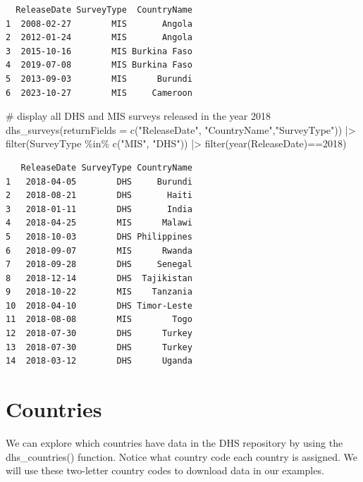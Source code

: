 \documentclass[
  letterpaper,
  DIV=11,
  numbers=noendperiod]{scrreprt}
\newenvironment{Shaded}{\begin{snugshade}}{\end{snugshade}}
\newcommand{\AttributeTok}[1]{\textcolor[rgb]{0.40,0.45,0.13}{#1}}
\newcommand{\CommentTok}[1]{\textcolor[rgb]{0.37,0.37,0.37}{#1}}
\newcommand{\DecValTok}[1]{\textcolor[rgb]{0.68,0.00,0.00}{#1}}
\newcommand{\FunctionTok}[1]{\textcolor[rgb]{0.28,0.35,0.67}{#1}}
\newcommand{\NormalTok}[1]{\textcolor[rgb]{0.00,0.23,0.31}{#1}}
\newcommand{\SpecialCharTok}[1]{\textcolor[rgb]{0.37,0.37,0.37}{#1}}
\newcommand{\StringTok}[1]{\textcolor[rgb]{0.13,0.47,0.30}{#1}}
\begin{document}
\begin{verbatim}
  ReleaseDate SurveyType  CountryName
1  2008-02-27        MIS       Angola
2  2012-01-24        MIS       Angola
3  2015-10-16        MIS Burkina Faso
4  2019-07-08        MIS Burkina Faso
5  2013-09-03        MIS      Burundi
6  2023-10-27        MIS     Cameroon
\end{verbatim}

\begin{Shaded}
\begin{Highlighting}[]
\CommentTok{\# display all DHS and MIS surveys released in the year 2018}
\FunctionTok{dhs\_surveys}\NormalTok{(}\AttributeTok{returnFields =}
                        \FunctionTok{c}\NormalTok{(}\StringTok{"ReleaseDate"}\NormalTok{, }\StringTok{"CountryName"}\NormalTok{,}\StringTok{"SurveyType"}\NormalTok{)) }\SpecialCharTok{|\textgreater{}}
  \FunctionTok{filter}\NormalTok{(SurveyType }\SpecialCharTok{\%in\%} \FunctionTok{c}\NormalTok{(}\StringTok{"MIS"}\NormalTok{, }\StringTok{"DHS"}\NormalTok{)) }\SpecialCharTok{|\textgreater{}}
  \FunctionTok{filter}\NormalTok{(}\FunctionTok{year}\NormalTok{(ReleaseDate)}\SpecialCharTok{==}\DecValTok{2018}\NormalTok{)}
\end{Highlighting}
\end{Shaded}

\begin{verbatim}
   ReleaseDate SurveyType CountryName
1   2018-04-05        DHS     Burundi
2   2018-08-21        DHS       Haiti
3   2018-01-11        DHS       India
4   2018-04-25        MIS      Malawi
5   2018-10-03        DHS Philippines
6   2018-09-07        MIS      Rwanda
7   2018-09-28        DHS     Senegal
8   2018-12-14        DHS  Tajikistan
9   2018-10-22        MIS    Tanzania
10  2018-04-10        DHS Timor-Leste
11  2018-08-08        MIS        Togo
12  2018-07-30        DHS      Turkey
13  2018-07-30        DHS      Turkey
14  2018-03-12        DHS      Uganda
\end{verbatim}

\hypertarget{countries}{%
\section{Countries}\label{countries}}

We can explore which countries have data in the DHS repository by using
the dhs\_countries() function. Notice what country code each country is
assigned. We will use these two-letter country codes to download data in
our examples.
\end{document}
